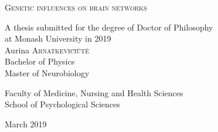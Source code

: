\thispagestyle{empty}
\begin{center}

\begin{center}
\end{center}

\parbox{150mm}{\fontsize{20}{20}\bf\centering 

             \textsc{Genetic influences on brain networks}}
              
\fontsize{16}{16}


{\Large A thesis submitted for the degree of Doctor of Philosophy} \\
{\Large at Monash University in 2019}\\


{\Large Aurina \textsc{Arnatkevi\u{c}i\={u}t\.{e}}}\\
Bachelor of Physics\\Master of Neurobiology

{\Large Faculty of Medicine, Nursing and Health Sciences}\\
{\Large School of Psychological Sciences}


{March 2019}

\end{center}

\clearpage \thispagestyle{empty} \cleardoublepage 

